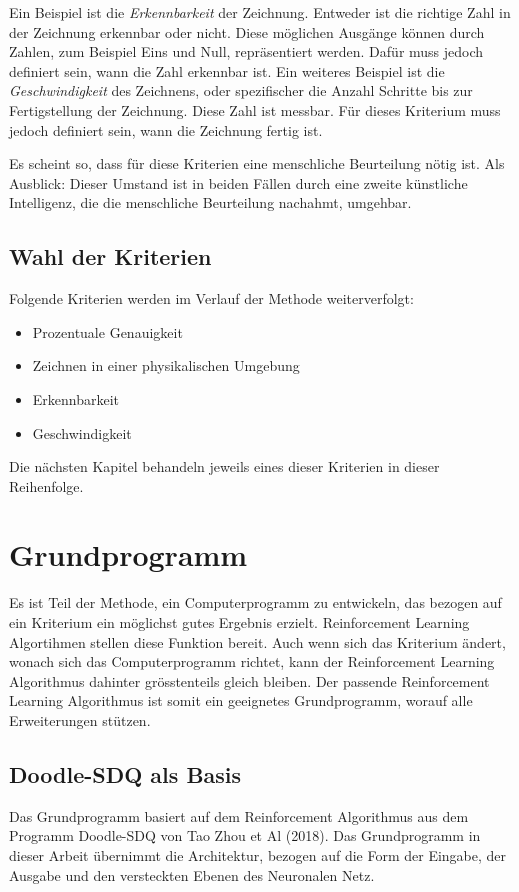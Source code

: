 Ein Beispiel ist die \emph{Erkennbarkeit} der Zeichnung. Entweder ist die
richtige Zahl in der Zeichnung erkennbar oder nicht. Diese möglichen Ausgänge
können durch Zahlen, zum Beispiel Eins und Null, repräsentiert werden. Dafür
muss jedoch definiert sein, wann die Zahl erkennbar ist. 
Ein weiteres Beispiel ist die \emph{Geschwindigkeit} des Zeichnens, oder
spezifischer die Anzahl Schritte bis zur Fertigstellung der Zeichnung. Diese
Zahl ist messbar. Für dieses Kriterium muss jedoch definiert sein, wann die
Zeichnung fertig ist.

Es scheint so, dass für diese Kriterien eine menschliche Beurteilung nötig ist.
Als Ausblick: Dieser Umstand ist in beiden Fällen durch eine zweite
künstliche Intelligenz, die die menschliche Beurteilung nachahmt, umgehbar.

\subsection*{Wahl der Kriterien}
Folgende Kriterien werden im Verlauf der Methode weiterverfolgt:

\begin{itemize}
  \item Prozentuale Genauigkeit
  \item Zeichnen in einer physikalischen Umgebung
  \item Erkennbarkeit 
  \item Geschwindigkeit
\end{itemize}

Die nächsten Kapitel behandeln jeweils eines dieser Kriterien in dieser Reihenfolge.


\section{Grundprogramm}
Es ist Teil der Methode, ein Computerprogramm zu entwickeln, das bezogen auf ein
Kriterium ein möglichst gutes Ergebnis erzielt. Reinforcement Learning
Algortihmen stellen diese Funktion bereit. Auch wenn sich das Kriterium ändert,
wonach sich das Computerprogramm richtet, kann der Reinforcement Learning
Algorithmus dahinter grösstenteils gleich bleiben. Der passende Reinforcement
Learning Algorithmus ist somit ein geeignetes Grundprogramm, worauf alle
Erweiterungen stützen. 

\subsection*{Doodle-SDQ als Basis}
Das Grundprogramm basiert auf dem Reinforcement Algorithmus aus dem Programm
Doodle-SDQ von Tao Zhou et Al (2018). Das Grundprogramm in dieser Arbeit
übernimmt die Architektur, bezogen auf die Form der Eingabe, der Ausgabe und den
versteckten Ebenen des Neuronalen Netz.

